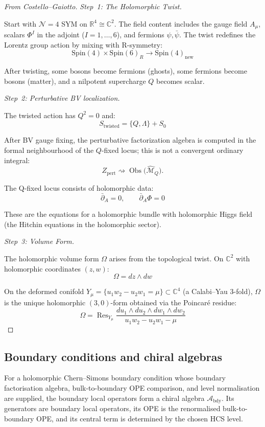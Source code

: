 \begin{proof}[From Costello--Gaiotto]
\emph{Step~1: The Holomorphic Twist.}

Start with $\mathcal{N}=4$ SYM on $\mathbb{R}^4 \cong \mathbb{C}^2$. The field
content includes the gauge field $A_\mu$, scalars $\Phi^I$ in the adjoint ($I=1,\ldots,6$), and fermions $\psi, \bar{\psi}$. The twist redefines the Lorentz group action by mixing with R-symmetry:
\[\text{Spin}(4) \times \text{Spin}(6)_R \to \text{Spin}(4)_{\text{new}}\]

After twisting, some bosons become fermions (ghosts), some fermions become bosons (matter), and a nilpotent supercharge $Q$ becomes scalar.

\emph{Step~2: Perturbative BV localization.}

The twisted action has $Q^2 = 0$ and:
\[S_{\text{twisted}} = \{Q, \Lambda\} + S_0\]

After BV gauge fixing, the perturbative factorization algebra is
computed in the formal neighbourhood of the \(Q\)-fixed locus; this is
not a convergent ordinary integral:
\[Z_{\mathrm{pert}}
  \rightsquigarrow
  \operatorname{Obs}\bigl(\widehat{\mathcal{M}}_{Q}\bigr).\]

The Q-fixed locus consists of holomorphic data:
\[\bar{\partial}_A = 0, \qquad \bar{\partial}_A \Phi = 0\]

These are the equations for a holomorphic bundle with holomorphic Higgs field (the Hitchin equations in the holomorphic sector).

\emph{Step~3: Volume Form.}

The holomorphic volume form $\Omega$ arises from the topological twist. On
$\mathbb{C}^2$ with holomorphic coordinates $(z,w)$:
\[\Omega = dz \wedge dw\]

On the deformed conifold $Y_\mu = \{u_1 w_2 - u_2 w_1 = \mu\} \subset \mathbb{C}^4$ (a Calabi--Yau 3-fold), $\Omega$ is the unique holomorphic $(3,0)$-form obtained via the Poincar\'{e} residue:
\[\Omega = \operatorname{Res}_{Y_\mu}\frac{du_1 \wedge du_2 \wedge dw_1 \wedge dw_2}{u_1 w_2 - u_2 w_1 - \mu}\]
\end{proof}

\subsection{Boundary conditions and chiral algebras}

\begin{theorem}
\label{thm:boundary-chiral-algebra-bv}
For a holomorphic Chern--Simons boundary condition whose boundary
factorisation algebra, bulk-to-boundary OPE comparison, and level
normalisation are supplied, the boundary local operators form a chiral
algebra $\mathcal{A}_{\text{bdy}}$. Its generators are boundary local
operators, its OPE is the renormalised bulk-to-boundary OPE, and its
central term is determined by the chosen HCS level.
\end{theorem}

